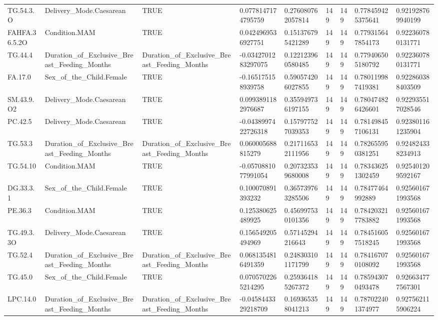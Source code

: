 \begin{longtable}{lllllllll}
TG.54.3.O & Delivery\_Mode.Caesarean & TRUE & 0.0778147174795759 & 0.276080762057814 & 149 & 149 & 0.778459425375641 & 0.921928769940199 \\
FAHFA.36.5.2O & Condition.MAM & TRUE & 0.0424969536927751 & 0.151376795421289 & 149 & 149 & 0.779315647854173 & 0.922360780131771 \\
TG.44.4 & Duration\_of\_Exclusive\_Breast\_Feeding\_Months & Duration\_of\_Exclusive\_Breast\_Feeding\_Months & -0.0342701283297075 & 0.122123960580485 & 149 & 149 & 0.779406505180792 & 0.922360780131771 \\
FA.17.0 & Sex\_of\_the\_Child.Female & TRUE & -0.165175158939758 & 0.590574206027855 & 149 & 149 & 0.780119987419381 & 0.922860388403509 \\
SM.43.9.O2 & Delivery\_Mode.Caesarean & TRUE & 0.0993891182976687 & 0.355949736197155 & 149 & 149 & 0.780474826426601 & 0.922935517028546 \\
PC.42.5 & Delivery\_Mode.Caesarean & TRUE & -0.0438997422726318 & 0.157977527039353 & 149 & 149 & 0.781498457106131 & 0.923801161235904 \\
TG.53.3 & Duration\_of\_Exclusive\_Breast\_Feeding\_Months & Duration\_of\_Exclusive\_Breast\_Feeding\_Months & 0.060005688815279 & 0.217116532111956 & 149 & 149 & 0.782655950381251 & 0.924824338234913 \\
TG.54.10 & Condition.MAM & TRUE & -0.0570881077991054 & 0.207323539680008 & 149 & 149 & 0.783436251302459 & 0.925401209592167 \\
DG.33.3.1 & Sex\_of\_the\_Child.Female & TRUE & 0.100070891393232 & 0.365739763285506 & 149 & 149 & 0.78477464992889 & 0.925601671993568 \\
PE.36.3 & Condition.MAM & TRUE & 0.125380625489925 & 0.456997530101356 & 149 & 149 & 0.784203217783882 & 0.925601671993568 \\
TG.49.3.3O & Delivery\_Mode.Caesarean & TRUE & 0.156549205494969 & 0.57145294216643 & 149 & 149 & 0.784516057518245 & 0.925601671993568 \\
TG.52.4 & Duration\_of\_Exclusive\_Breast\_Feeding\_Months & Duration\_of\_Exclusive\_Breast\_Feeding\_Months & 0.0681354816491359 & 0.248303101171799 & 149 & 149 & 0.784167070108092 & 0.925601671993568 \\
TG.45.0 & Sex\_of\_the\_Child.Female & TRUE & 0.0705702265214295 & 0.259364185267372 & 149 & 149 & 0.785943070493478 & 0.926634777567301 \\
LPC.14.0 & Duration\_of\_Exclusive\_Breast\_Feeding\_Months & Duration\_of\_Exclusive\_Breast\_Feeding\_Months & -0.0458443329218709 & 0.169365358041213 & 149 & 149 & 0.787022401374977 & 0.927562115906224 \\

\end{longtable}
